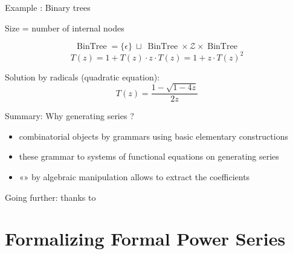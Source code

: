 \documentclass[compress,11pt]{beamer}
\def\opstyle#1{\ensuremath{\operatorname{#1}}}
\newcommand{\BinTree}{\opstyle{BinTree}}
\newcommand{\mZ}{\mathcal{Z}}
\renewcommand{\emph}[1]{{\color{red} #1}}
\begin{document}
\begin{frame}[fragile]{Example : Binary trees}

  Size = number of internal nodes

  \begin{center}
  \end{center}
  \[\BinTree = \{\epsilon\}\ \sqcup\ \BinTree\times\mZ\times\BinTree\]
  \[T(z) = 1 + T(z) \cdot z \cdot T(z) = 1 + z \cdot T(z)^2\]
  \bigskip\pause

  Solution by radicals (quadratic equation):
  \[T(z) = \frac{1 - \sqrt{1-4z}}{2z}\]
\end{frame}

\begin{frame}{Summary: Why generating series ?}

  \begin{NOTE}
    \begin{itemize}
    \item {} combinatorial objects by \emph{grammars} using
      basic elementary constructions
    \item {} these grammar to \emph{systems of functional
        equations} on generating series
    \item «»  by algebraic manipulation allows
      to extract the coefficients
    \end{itemize}
  \end{NOTE}
  \bigskip
  
  Going further:  thanks to 
\end{frame}

\section{Formalizing Formal Power Series}
\end{document}
